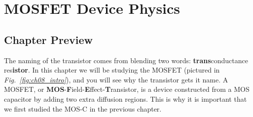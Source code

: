 \chapter{MOSFET Device Physics}
\label{ch:ch08_mos}
\graphicspath{{./figures/figs_ch08_mos/}}
\section{Chapter Preview}
The naming of the transistor comes from blending two words: \textbf{trans}conductance res\textbf{istor}.  In this chapter we will be studying the MOSFET (pictured in \emph{Fig.~\ref{fig:ch08_intro}}), and you will see why the transistor gets it name.  A MOSFET, or \textbf{MOS}-\textbf{F}ield-\textbf{E}ffect-\textbf{T}ransistor, is a device constructed from a MOS capacitor by adding two extra diffusion regions.  This is why it is important that we first studied the MOS-C in the previous chapter.

